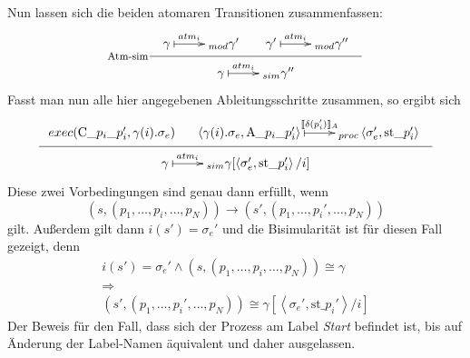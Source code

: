 Nun lassen sich die beiden atomaren Transitionen zusammenfassen:
\[
\inference[Atm-sim]{
  \xymatrix{ \gamma \ar@{|->}[r]^-{atm_i} & _{mod}
    \gamma'
  } &
  \xymatrix{ \gamma'\ar@{|->}[r]^-{atm_i} & _{mod}
    \gamma''
  }
}{
  \xymatrix{ \gamma \ar@{|->}[r]^-{atm_i} & _{sim}
    \gamma''
  }
}
\]
Fasst man nun alle hier angegebenen Ableitungsschritte zusammen, so ergibt sich
\[
\inference{
  exec(\textrm{C\_}p_i\textrm{\_}p_i',\gamma(i).\sigma_e) &
  \xymatrix{ \left<\gamma(i).\sigma_e,\textrm{A\_}p_i\textrm{\_}p_i'\right> \ar@{|->}[r]^-{\llbracket \delta(p_i')\rrbracket_A} & _{proc}
    \left<\sigma_e',\textrm{st\_}p_i'\right> }
}{
  \xymatrix{ \gamma \ar@{|->}[r]^-{atm_i} & _{sim}
    \gamma[\left<\sigma_e',\textrm{st\_}p_i'\right>/i]
  }
}
\]
Diese zwei Vorbedingungen sind genau dann erfüllt, wenn
\[ (s,(p_1,\dots,p_i,\dots,p_N))\rightarrow (s',(p_1,\dots,p_i',\dots,p_N)) \]
gilt.
Außerdem gilt dann $i(s') = \sigma_e'$ und die Bisimularität ist für diesen Fall gezeigt, denn
\[
\begin{array}{c}
  i(s') = \sigma_e' \land (s,(p_1,\dots,p_i,\dots,p_N))\cong\gamma\\
  \Rightarrow\\
  (s',(p_1,\dots,p_i',\dots,p_N))\cong \gamma[\left<\sigma_e',\textrm{st\_}p_i'\right>/i]
\end{array}
\]
Der Beweis für den Fall, dass sich der Prozess am Label \emph{Start} befindet ist, bis auf Änderung der Label-Namen äquivalent und daher ausgelassen.
